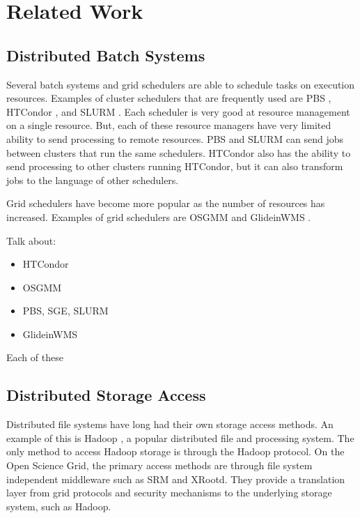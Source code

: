 \chapter{Related Work}
\label{chapter:relatedwork}

\section{Distributed Batch Systems}

Several batch systems and grid schedulers are able to schedule tasks on execution resources.  Examples of cluster schedulers that are frequently used are PBS \cite{pbstorque}, HTCondor \cite{litzkow1988condor}, and SLURM \cite{yoo2003slurm}.  Each scheduler is very good at resource management on a single resource.  But, each of these resource managers have very limited ability to send processing to remote resources.  PBS and SLURM can send jobs between clusters that run the same schedulers.  HTCondor also has the ability to send processing to other clusters running HTCondor, but it can also transform jobs to the language of other schedulers.

Grid schedulers have become more popular as the number of resources has increased.  Examples of grid schedulers are OSGMM \cite{website:osgmm} and GlideinWMS \cite{sfiligoi2008glideinwms}.    

Talk about:
\begin{itemize}
\item HTCondor
\item OSGMM
\item PBS, SGE, SLURM
\item GlideinWMS
\end{itemize}

Each of these 

\section{Distributed Storage Access}

Distributed file systems have long had their own storage access methods.  An example of this is Hadoop \cite{white2012hadoop}, a popular distributed file and processing system.  The only method to access Hadoop storage is through the Hadoop protocol.  On the Open Science Grid, the primary access methods are through file system independent middleware such as SRM and XRootd.  They provide a translation layer from grid protocols and security mechanisms to the underlying storage system, such as Hadoop.


